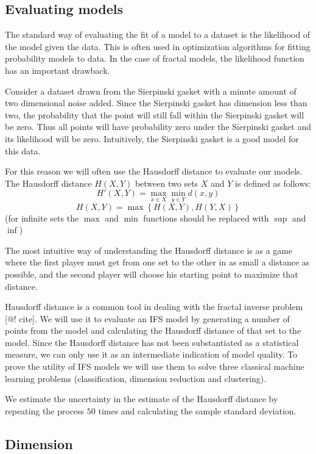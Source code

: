 \documentclass[11pt]{article}
\theoremstyle{definition}
\begin{document}
\subsection{Evaluating models}

The standard way of evaluating the fit of a model to a dataset is the likelihood of the model given the data. This is often used in optimization algorithms for fitting probability models to data. In the case of fractal models, the likelihood function has an important drawback. 

Consider a dataset drawn from the Sierpinski gasket with a minute amount of two dimensional noise added. Since the Sierpinski gasket has dimension less than two, the probability that the point will still fall within the Sierpinski gasket will be zero. Thus all points will have probability zero under the Sierpinski gasket and its likelihood will be zero. Intuitively, the Sierpinski gasket is a good model for this data.

For this reason we will often use the Hausdorff distance to evaluate our models. The Hausdorff distance  $H(X, Y)$ between two sets $X$ and $Y$ is defined as follows:
\[ 
H'(X, Y) = \max_{x\in X} \min_{y\in Y} d(x, y) 
\]
\[
H(X, Y) = \max\left \{H(X, Y), H(Y, X)\right\}
\]
 (for infinite sets the $\max$ and $\min$ functions should be replaced with $\sup$ and $\inf$)
 
The most intuitive way of understanding the Hausdorff distance is as a game where the first player must get from one set to the other in as small a distance as possible, and the second player will choose his starting point to maximize that distance.

Hausdorff distance is a common tool in dealing with the fractal inverse problem [@! cite]. We will use it to evaluate an IFS model by generating a number of points from the model and calculating the Hausdorff distance of that set to the model. Since the Hausdorff distance has not been substantiated as a statistical measure, we can only use it as an intermediate indication of model quality. To prove the utility of IFS models we will use them to solve three classical machine learning problems (classification, dimension reduction and clustering).

We estimate the uncertainty in the estimate of the Hausdorff distance by repeating the process $50$ times and calculating the sample standard deviation. 

\subsection{Dimension}
\end{document}
